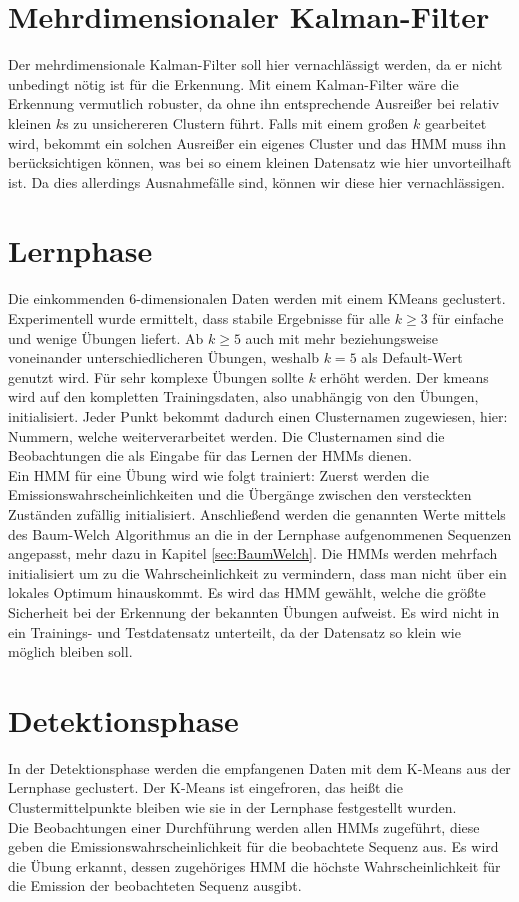 \documentclass{article}
\begin{document}
\section{Mehrdimensionaler Kalman-Filter}
Der mehrdimensionale Kalman-Filter soll hier vernachlässigt werden, da er nicht unbedingt nötig ist für die Erkennung.
Mit einem Kalman-Filter wäre die Erkennung vermutlich robuster, da ohne ihn entsprechende Ausreißer bei relativ kleinen $k$s zu unsichereren Clustern führt.
Falls mit einem großen $k$ gearbeitet wird, bekommt ein solchen Ausreißer ein eigenes Cluster und das HMM muss ihn berücksichtigen können, was bei so einem kleinen Datensatz wie hier unvorteilhaft ist.
Da dies allerdings Ausnahmefälle sind, können wir diese hier vernachlässigen.
\section{Lernphase}
Die einkommenden 6-dimensionalen Daten werden mit einem KMeans geclustert.
Experimentell wurde ermittelt, dass stabile Ergebnisse für alle $k \geq 3$  für einfache und wenige Übungen liefert.
Ab $k \geq 5$ auch mit mehr beziehungsweise voneinander unterschiedlicheren Übungen, weshalb $k = 5$ als Default-Wert genutzt wird.
Für sehr komplexe Übungen sollte $k$ erhöht werden.
Der kmeans wird auf den kompletten Trainingsdaten, also unabhängig von den Übungen, initialisiert.
Jeder Punkt bekommt dadurch einen Clusternamen zugewiesen, hier: Nummern, welche weiterverarbeitet werden.
Die Clusternamen sind die Beobachtungen die als Eingabe für das Lernen der HMMs dienen.\\
Ein HMM für eine Übung wird wie folgt trainiert:
Zuerst werden die Emissionswahrscheinlichkeiten und die Übergänge zwischen den versteckten Zuständen zufällig initialisiert.
Anschließend werden die genannten Werte mittels des Baum-Welch Algorithmus an die in der Lernphase aufgenommenen Sequenzen angepasst, mehr dazu in Kapitel \ref{sec:BaumWelch}.
Die HMMs werden mehrfach initialisiert um zu die Wahrscheinlichkeit zu vermindern, dass man nicht über ein lokales Optimum hinauskommt.
Es wird das HMM gewählt, welche die größte Sicherheit bei der Erkennung der bekannten Übungen aufweist.
Es wird nicht in ein Trainings- und Testdatensatz unterteilt, da der Datensatz so klein wie möglich bleiben soll.

\section{Detektionsphase}
In der Detektionsphase werden die empfangenen Daten mit dem K-Means aus der Lernphase geclustert.
Der K-Means ist eingefroren, das heißt die Clustermittelpunkte bleiben wie sie in der Lernphase festgestellt wurden.\\
Die Beobachtungen einer Durchführung werden allen HMMs zugeführt, diese geben die Emissionswahrscheinlichkeit für die beobachtete Sequenz aus.
Es wird die Übung erkannt, dessen zugehöriges HMM die höchste Wahrscheinlichkeit für die Emission der beobachteten Sequenz ausgibt.
\end{document}
